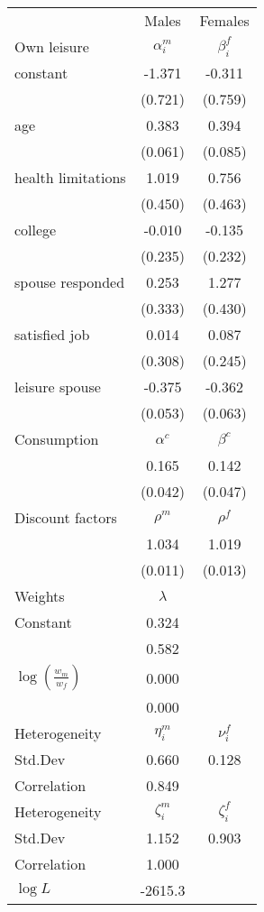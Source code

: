 \begin{tabular}{lcc} 
\hline\hline 
 & Males & Females \\ 
Own leisure & $\alpha_{i}^{m}$ & $\beta_{i}^{f}$ \\ 
constant & -1.371 & -0.311 \\ 
 & (0.721) & (0.759) \\ 
age & 0.383 & 0.394 \\ 
 & (0.061) & (0.085) \\ 
health limitations & 1.019 & 0.756 \\ 
 & (0.450) & (0.463) \\ 
college & -0.010 & -0.135 \\ 
 & (0.235) & (0.232) \\ 
spouse responded & 0.253 & 1.277 \\ 
 & (0.333) & (0.430) \\ 
satisfied job & 0.014 & 0.087 \\ 
 & (0.308) & (0.245) \\ 
leisure spouse & -0.375 & -0.362 \\ 
 & (0.053) & (0.063) \\ 
Consumption & $\alpha^{c}$ & $\beta^{c}$ \\ 
 & 0.165 & 0.142 \\ 
 & (0.042) & (0.047) \\ 
Discount factors & $\rho^m$ & $\rho^f$ \\ 
 & 1.034 & 1.019 \\ 
 & (0.011) & (0.013) \\ 
Weights & $\lambda$ &  \\ 
Constant & 0.324 &  \\ 
 & 0.582 &  \\ 
$\log(\frac{w_m}{w_f})$ & 0.000 &  \\ 
 & 0.000 &  \\ 
Heterogeneity & $\eta_i^m$ & $\nu_i^f$ \\ 
Std.Dev & 0.660 & 0.128 \\ 
Correlation & 0.849 &  \\ 
Heterogeneity & $\zeta_i^m$ & $\zeta_i^f$ \\ 
Std.Dev & 1.152 & 0.903 \\ 
Correlation & 1.000 &  \\ 
\hline 
$\log L$ & -2615.3 & \\ 
\hline \hline 
\end{tabular} 
